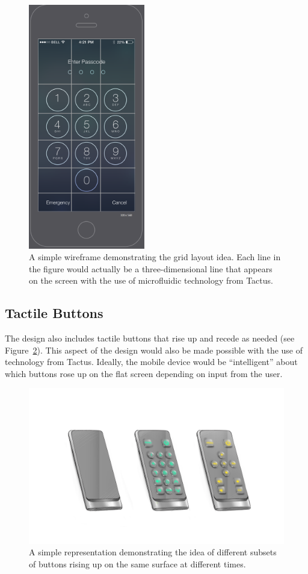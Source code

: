 \documentclass[11pt]{article}
\begin{document}
\begin{figure}[ht]
\centering
\includegraphics[width=2in]{wireframe-grid.png} 
\caption{A simple wireframe demonstrating the grid layout idea. Each line in the figure would actually be a three-dimensional line that appears on the screen with the use of microfluidic technology from Tactus.}
\label{wireframe-grid}
\end{figure}

\subsection{Tactile Buttons}
The design also includes tactile buttons that rise up and recede as needed (see Figure~\ref{buttons}). This aspect of the design would also be made possible with the use of technology from Tactus. Ideally, the mobile device would be ``intelligent'' about which buttons rose up on the flat screen depending on input from the user.
 
\begin{figure}[ht]
\centering
\includegraphics[width=6in]{buttons.jpg}
\caption{A simple representation demonstrating the idea of different subsets of buttons rising up on the same surface at different times.}
\label{buttons}
\end{figure}
\end{document}
